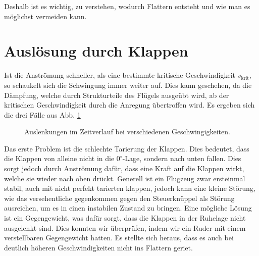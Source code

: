 \documentclass[12pt,a4paper,titlepage,headinclude,bibtotoc]{scrartcl}
\begin{document}
Deshalb ist es wichtig, zu verstehen, wodurch Flattern entsteht und wie man es möglichst vermeiden kann.


\section{Auslösung durch Klappen}
Ist die Anströmung schneller, als eine bestimmte kritische Geschwindigkeit $v_\text{krit}$, so schaukelt sich die Schwingung immer weiter auf.
Dies kann geschehen, da die Dämpfung, welche durch Strukturteile des Flügels ausgeübt wird, ab der kritischen Geschwindigkeit durch die Anregung übertroffen wird.
Es ergeben sich die drei Fälle aus Abb. \ref{fig:daempfung}

\begin{figure}[h]
  \centering
  \hfill
  \hfill
  \caption{Auslenkungen im Zeitverlauf bei verschiedenen Geschwingigkeiten.}
  \label{fig:daempfung}
\end{figure}

Das erste Problem ist die schlechte Tarierung der Klappen.
Dies bedeutet, dass die Klappen von alleine nicht in die $0^\circ$-Lage, sondern nach unten fallen.
Dies sorgt jedoch durch Anströmung dafür, dass eine Kraft auf die Klappen wirkt, welche sie wieder nach oben drückt.
Generell ist ein Flugzeug zwar ersteinmal stabil, auch mit nicht perfekt tarierten klappen, jedoch kann eine kleine Störung, wie das versehentliche gegenkommen gegen den Steuerknüppel als Störung ausreichen, um es in einen instabilen Zustand zu bringen.
Eine mögliche Lösung ist ein Gegengewicht, was dafür sorgt, dass die Klappen in der Ruhelage nicht ausgelenkt sind.
Dies konnten wir überprüfen, indem wir ein Ruder mit einem verstellbaren Gegengewicht hatten.
Es stellte sich heraus, dass es auch bei deutlich höheren Geschwindigkeiten nicht ins Flattern geriet.
\end{document}
